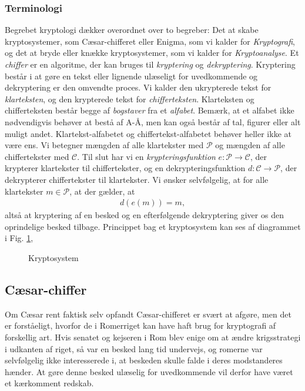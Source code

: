 \documentclass[12pt]{article}
\begin{document}
\subsubsection*{Terminologi}
Begrebet kryptologi dækker overordnet over to begreber: Det at skabe kryptosystemer, som Cæsar-chifferet eller Enigma, som vi kalder for \textit{Kryptografi}, og det at bryde eller knække kryptosystemer, som vi kalder for \textit{Kryptoanalyse}. Et \textit{chiffer} er en algoritme, der kan bruges til \textit{kryptering} og \textit{dekryptering}. Kryptering består i at gøre en tekst eller lignende ulæseligt for uvedkommende og dekryptering er den omvendte proces. Vi kalder den ukrypterede tekst for \textit{klarteksten}, og den krypterede tekst for \textit{chifferteksten}. Klarteksten og chifferteksten består begge af \textit{bogstaver} fra et \textit{alfabet}. Bemærk, at et alfabet ikke nødvendigvis behøver at bestå af A-Å, men kan også består af tal, figurer eller alt muligt andet. Klartekst-alfabetet og chiffertekst-alfabetet behøver heller ikke at være ens. Vi betegner mængden af alle klartekster med $\mathscr{P}$ og mængden af alle chiffertekster med $\mathscr{C}$. Til slut har vi en \textit{krypteringsfunktion} $e:\mathscr{P} \to \mathscr{C}$, der krypterer klartekster til chiffertekster, og en dekrypteringsfunktion $d:\mathscr{C} \to \mathscr{P}$, der dekrypterer chiffertekster til klartekster. Vi ønsker selvfølgelig, at for alle klartekster $m\in \mathscr{P}$, at der gælder, at 
\begin{align*}
d(e(m)) = m,
\end{align*}
altså at kryptering af en besked og en efterfølgende dekryptering giver os den oprindelige besked tilbage. Princippet bag et kryptosystem kan ses af diagrammet i Fig. \ref{fig:krypto},
\begin{figure}[H]
\centering
{}
\caption{Kryptosystem}
\label{fig:krypto}
\end{figure}

\subsection*{Cæsar-chiffer}
Om Cæsar rent faktisk selv opfandt Cæsar-chifferet er svært at afgøre, men det er forståeligt, hvorfor de i Romerriget kan have haft brug for kryptografi af forskellig art. Hvis senatet og kejseren i Rom blev enige om at ændre krigsstrategi i udkanten af riget, så var en besked lang tid undervejs, og romerne var selvfølgelig ikke interesserede i, at beskeden skulle falde i deres modstanderes hænder. At gøre denne besked ulæselig for uvedkommende vil derfor have været et kærkomment redskab. 
\end{document}
